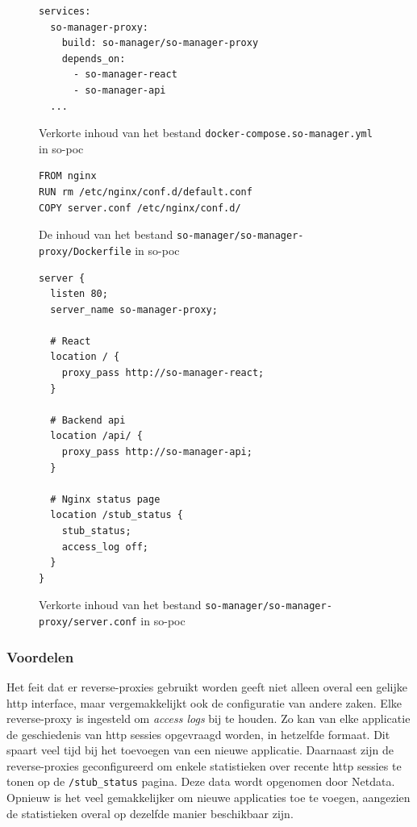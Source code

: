 \documentclass[a4paper, 12pt]{report}
\begin{document}
\begin{figure}[H]
  \begin{lstlisting}
services:
  so-manager-proxy:
    build: so-manager/so-manager-proxy
    depends_on:
      - so-manager-react
      - so-manager-api
  ...
  \end{lstlisting}
  \caption{Verkorte inhoud van het bestand \lstinline|docker-compose.so-manager.yml| in so-poc}
  \label{fig:proxy-voorbeeld-compose}
\end{figure}

\begin{figure}[H]
  \begin{lstlisting}
FROM nginx
RUN rm /etc/nginx/conf.d/default.conf
COPY server.conf /etc/nginx/conf.d/
  \end{lstlisting}
  \caption{De inhoud van het bestand \lstinline|so-manager/so-manager-proxy/Dockerfile| in so-poc}
  \label{fig:proxy-voorbeeld-dockerfile}
\end{figure}

\begin{figure}[H]
  \begin{lstlisting}
server {
  listen 80;
  server_name so-manager-proxy;

  # React
  location / {
    proxy_pass http://so-manager-react;
  }

  # Backend api
  location /api/ {
    proxy_pass http://so-manager-api;
  }

  # Nginx status page
  location /stub_status {
    stub_status;
    access_log off;
  }
}
  \end{lstlisting}
  \caption{Verkorte inhoud van het bestand \lstinline|so-manager/so-manager-proxy/server.conf| in so-poc}
  \label{fig:proxy-voorbeeld-server-conf}
\end{figure}


\subsubsection{Voordelen}
Het feit dat er reverse-proxies gebruikt worden geeft niet alleen overal een gelijke http interface, maar vergemakkelijkt ook de configuratie van andere zaken.
Elke reverse-proxy is ingesteld om \emph{access logs} bij te houden.
Zo kan van elke applicatie de geschiedenis van http sessies opgevraagd worden, in hetzelfde formaat.
Dit spaart veel tijd bij het toevoegen van een nieuwe applicatie.
Daarnaast zijn de reverse-proxies geconfigureerd om enkele statistieken over recente http sessies te tonen op de \lstinline|/stub_status| pagina.
Deze data wordt opgenomen door Netdata.
Opnieuw is het veel gemakkelijker om nieuwe applicaties toe te voegen, aangezien de statistieken overal op dezelfde manier beschikbaar zijn.
\end{document}
